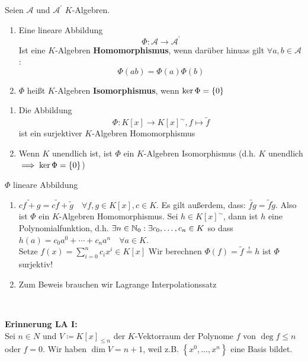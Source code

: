 \begin{subdefinition}
	Seien $ \mathcal{A}  $ und $ \mathcal{A} ^\prime  $ $ K $-Algebren.
	\begin{enumerate}[label=(\roman*)]
		\item Eine lineare Abbildung
			\[
				\Phi : \mathcal{A} \to \mathcal{A}^\prime 
			\]
			Ist eine $ K $-Algebren \textbf{Homomorphismus}, wenn darüber hinuas gilt $ \forall  a, b \in \mathcal{A}  $:
			\[
				\Phi(ab) = \Phi(a) \Phi(b)
			\]
		\item $ \Phi $ heißt $ K $-Algebren \textbf{Isomorphismus}, wenn $ \operatorname{ker} \Phi = \left\{ 0 \right\}  $
	\end{enumerate}
\end{subdefinition}

\begin{subtheorem}
	\begin{enumerate}[label=(\roman*)]
		\item Die Abbildung
			\[
				\Phi : K[x] \to K[x]^\sim, f \mapsto \tilde{f}
			\]
			ist ein surjektiver $ K $-Algebren Homomorphismus
		\item Wenn $ K $ unendlich ist, ist $ \Phi $ ein $ K $-Algebren Isomorphismus (d.h. $ K $ unendlich $ \implies  \operatorname{ker} \Phi = \left\{ 0 \right\}  $)
	\end{enumerate}
\end{subtheorem}

\begin{subproof*}
	$ \Phi $ lineare Abbildung
	\begin{enumerate}[label=(\roman*)]
		\item $ \tilde{c f + g} = c \tilde{f} + \tilde{g} \quad \forall f, g \in K[x], c \in K$.
			Es gilt außerdem, dass: $ \tilde{fg} = \tilde{f} \tilde{g} $.
			Also ist $ \Phi $ ein $ K $-Algebren Homomorphismus.
			Sei $ h \in K[x]^\sim $, dann ist $ h $ eine Polynomialfunktion, d.h. $ \exists n \in \mathbb{N} _0 : \exists c_0, \dotsc, c_n \in K $ so dass $ h(a) = c_0 a^0 + \dotsb + c_n a^n \quad \forall a \in K $.\\
			Setze $ f(x) = \sum_{i=0}^{n} c_i x^i \in K[x] $ Wir berechnen $ \Phi(f) = \tilde{f} \overset{!}{=} h $ ist $ \Phi $ surjektiv!
		\item Zum Beweis brauchen wir Lagrange Interpolationssatz
	\end{enumerate}
\end{subproof*}~\par

\textbf{Erinnerung LA I:}\\
Sei $ n \in N $ und $ V \coloneqq K[x]_{\leq n}  $ der $ K $-Vektorraum der Polynome $ f $ von $ \deg f \leq n $ oder $ f = 0 $.
Wir haben $ \dim V = n + 1 $, weil z.B. $ \left\{ x^0, \dotsc, x^n \right\}  $ eine Basis bildet.


